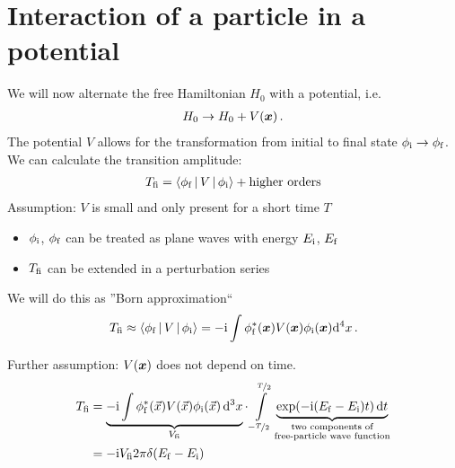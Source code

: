 \section{Interaction of a particle in a potential}\label{sec:Interaction_particle_potential}
We will now alternate the free Hamiltonian $H_0$ with a potential, i.e.
\begin{align}
    H_0 \rightarrow H_0 + V\qty({\bm{x}})\,.
\end{align}
The potential $V$ allows for the transformation from initial to final state $\phi_{\mathrm{i}} \rightarrow \phi_{\mathrm{f}}$. We can calculate the transition amplitude:
\begin{align}
    T_{\mathrm{fi}} = \Braket{\phi_{\mathrm{f}} | V | \phi_{\mathrm{i}}} + \text{higher orders}
\end{align}
Assumption: $V$ is small and only present for a short time $T$
\begin{itemize}[$\ra$]
    \item $\phi_{\mathrm{i}}$, $\phi_{\mathrm{f}}$ can be treated as plane waves with energy $E_{\mathrm{i}}$, $E_{\mathrm{f}}$
    \item $T_{\mathrm{fi}}$ can be extended in a perturbation series
\end{itemize}
We will do this as ''Born approximation``
\begin{align}
    T_{\mathrm{fi}} \approx \Braket{\phi_{\mathrm{f}}| V | \phi_{\mathrm{i}}} = - \mathrm{i} \int \phi_{\mathrm{f}}^* \qty({\bm{x}}) V\qty({\bm{x}}) \phi_{\mathrm{i}} \qty({\bm{x}}) \dd[4]x\,.
\end{align}
\begin{center}
\end{center}
Further assumption: $V\qty({\bm{x}})$ does not depend on time.
\begin{align}\begin{split}
    T_{\mathrm{fi}} & = \underbrace{-\mathrm{i} \int \phi_{\mathrm{f}}^* \qty(\vec x) V\qty(\vec x) \phi_{\mathrm{i}}\qty(\vec x) \dd[3]{x}}_{V_{\mathrm{fi}}} \cdot \int\limits_{-\nicefrac T2}^{\nicefrac T2} \underbrace{\exp(-\mathrm{i} \qty(E_{\mathrm{f}} - E_{\mathrm{i}})t) \dd{t}}_{\substack{\text{two components of}\\ \text{free-particle wave function}}} \\
    & = -\mathrm{i} V_{\mathrm{fi}} 2 \pi \delta \qty(E_{\mathrm{f}} - E_{\mathrm{i}})
\end{split}\end{align}

